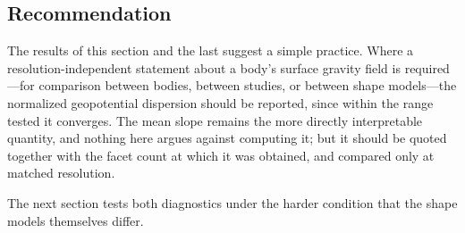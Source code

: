\subsection{Recommendation}
\label{sec:varrecommend}

The results of this section and the last suggest a simple practice. Where a
resolution-independent statement about a body's surface gravity field is
required---for comparison between bodies, between studies, or between shape
models---the normalized geopotential dispersion should be reported, since within
the range tested it converges. The mean slope remains the more directly
interpretable quantity, and nothing here argues against computing it; but it
should be quoted together with the facet count at which it was obtained, and
compared only at matched resolution.

The next section tests both diagnostics under the harder condition that the
shape models themselves differ.
